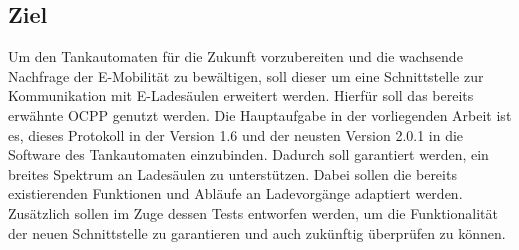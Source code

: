 \subsection{Ziel}
Um den Tankautomaten für die Zukunft vorzubereiten und die wachsende Nachfrage der E-Mobilität zu bewältigen, soll dieser um eine Schnittstelle zur Kommunikation mit E-Ladesäulen erweitert werden. Hierfür soll das bereits erwähnte OCPP genutzt werden. Die Hauptaufgabe in der vorliegenden Arbeit ist es, dieses Protokoll in der Version 1.6 und der neusten Version 2.0.1 in die Software des Tankautomaten einzubinden. Dadurch soll garantiert werden, ein breites Spektrum an Ladesäulen zu unterstützen. Dabei sollen die bereits existierenden Funktionen und Abläufe an Ladevorgänge adaptiert werden. Zusätzlich sollen im Zuge dessen Tests entworfen werden, um die Funktionalität der neuen Schnittstelle zu garantieren und auch zukünftig überprüfen zu können.

\newpage



